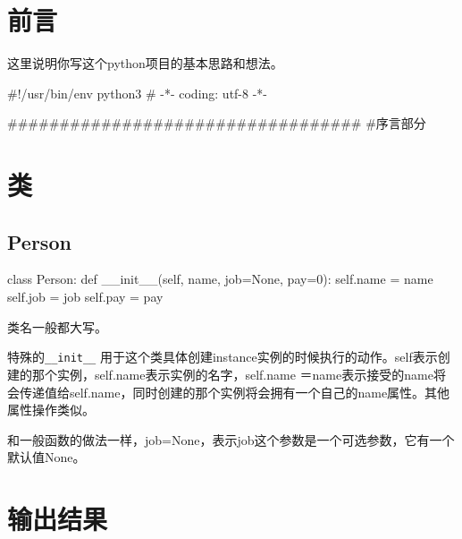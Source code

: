 \documentclass[11pt,oneside]{book}
\begin{document}
\frontmatter

\author{作者}
\titleLC

\chapter*{前言}
\begin{common-format}
这里说明你写这个python项目的基本思路和想法。


\begin{python}
#!/usr/bin/env python3
# -*- coding: utf-8 -*-

##################################
#序言部分
\end{python}


\end{common-format}


\setcounter{tocdepth}{2}
\tableofcontents

\begin{common-format}
\mainmatter

\chapter{类}
\section{Person}
\begin{python}
class Person:
    def __init__(self, name, job=None, pay=0):
        self.name = name
        self.job = job
        self.pay = pay
\end{python}

类名一般都大写。

特殊的\verb+__init__+ 用于这个类具体创建instance实例的时候执行的动作。self表示创建的那个实例，self.name表示实例的名字，self.name ＝name表示接受的name将会传递值给self.name，同时创建的那个实例将会拥有一个自己的name属性。其他属性操作类似。

和一般函数的做法一样，job=None，表示job这个参数是一个可选参数，它有一个默认值None。



\chapter{输出结果}
\debugpython


\end{common-format}
\end{document}
